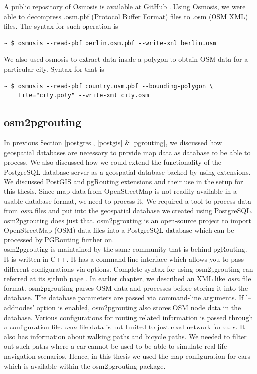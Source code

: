 A public repository of Osmosis is available at GitHub \cite{osmosis}. Using Osmosis, we were able to decompress .osm.pbf (Protocol Buffer Format) files to .osm (OSM XML) files. The syntax for such operation is 
\begin{lstlisting}[frame = single]
~ $ osmosis --read-pbf berlin.osm.pbf --write-xml berlin.osm
\end{lstlisting}

We also used osmosis to extract data inside a polygon to obtain OSM data for a particular city. Syntax for that is
\begin{lstlisting}[frame=single]
~ $ osmosis --read-pbf country.osm.pbf --bounding-polygon \
    file="city.poly" --write-xml city.osm
\end{lstlisting}

\subsection{osm2pgrouting} \label{osm2pgrout}
In previous Section \ref{postgres}, \ref{postgis} \& \ref{pgrouting}, we discussed how geospatial databases are necessary to provide map data as database to be able to process. We also discussed how we could extend the functionality of the PostgreSQL database server as a geospatial database backed by using extensions. We discussed PostGIS and pgRouting extensions and their use in the setup for this thesis. Since map data from OpenStreetMap is not readily available in a usable database format, we need to process it. We required a tool to process data from \textit{osm} files and put into the geospatial database we created using PostgreSQL. osm2pgrouting does just that. osm2pgrouting is an open-source project to import OpenStreetMap (OSM) data files into a PostgreSQL database which can be processed by PGRouting further on. 
\\

osm2pgrouting is maintained by the same community that is behind pgRouting. It is written in C++. It has a command-line interface which allows you to pass different configurations via options. Complete syntax for using osm2pgrouting can referred at its github page \cite{osm2pgrouting}. In earlier chapter, we described an XML like \textit{osm} file format. osm2pgrouting parses OSM data and processes before storing it into the database. The database parameters are passed via command-line arguments. If '--addnodes' option is enabled, osm2pgrouting also stores OSM node data in the database. Various configurations for routing related information is passed through a configuration file. \textit{osm} file data is not limited to just road network for cars. It also has information about walking paths and bicycle paths. We needed to filter out such paths where a car cannot be used to be able to simulate real-life navigation scenarios. Hence, in this thesis we used the map configuration for cars which is available within the osm2pgrouting package. \\

